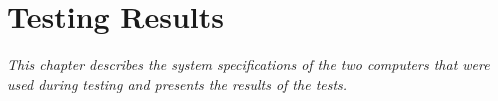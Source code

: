 \chapter{Testing Results} \label{chap:results}
\textit{This chapter describes the system specifications of the two computers that were used during testing and presents the results of the tests.}






